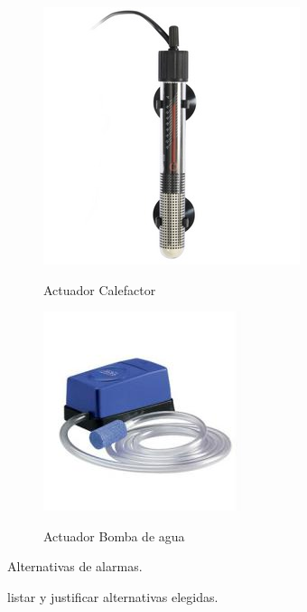 \begin{figure}[h!]
	\centering
    \includegraphics[width=.5\textwidth]{./Figures/actuador_heater}
	\label{fig:act_heater}
	\caption{Actuador Calefactor}
\end{figure}

\begin{figure}[h!]
	\centering
    \includegraphics[width=.5\textwidth]{./Figures/actuador_pump}
	\label{fig:act_pump}
	\caption{Actuador Bomba de agua}
\end{figure}

Alternativas de alarmas.

listar y justificar alternativas elegidas.